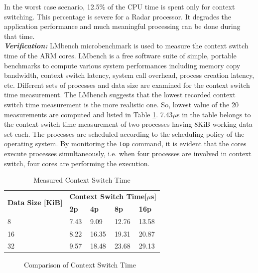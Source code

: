 In the worst case scenario, 12.5\% of the CPU time is spent only for context switching. This percentage is severe for a Radar processor. It degrades the application performance and much meaningful processing can be done during that time. \\

\textbf{\textsl{Verification:}} LMbench microbenchmark\cite{lmbench} is used to measure the context switch time of the ARM cores. LMbench is a free software suite of simple, portable benchmarks to compute various system performances including memory copy bandwidth, context switch latency, system call overhead, process creation latency, etc. Different sets of processes and data size are examined for the context switch time measurement. The LMbench suggests that the lowest recorded context switch time measurement is the more realistic one. So, lowest value of the 20 measurements are computed and listed in Table \ref{mm:ctxsw:lmbench}. 7.43$\mu$s in the table belongs to the context switch time measurement of two processes having 8KiB working data set each. The processes are scheduled according to the scheduling policy of the operating system. By monitoring the \verb|top| command, it is evident that the cores execute processes simultaneously, i.e. when four processes are involved in context switch, four cores are performing the execution.

\begin{table}[h!]
	\begin{tabularx}{\textwidth}{|X|X|X|X|X|}
		\hline
		\multirow{2}{*}{\textbf{Data Size [KiB]}} & \multicolumn{4}{c|}{\textbf{Context Switch Time[\boldmath$\mu$s]}} \\ \cline{2-5}
		& \textbf{2p} & \textbf{4p} & \textbf{8p} & \textbf{16p}  \\ \hline 
		8 & 7.43 & 9.09 & 12.76 & 13.58 \\ \hline
		16 & 8.22 & 16.35 & 19.31 & 20.87 \\ \hline
		32 & 9.57 & 18.48 & 23.68 & 29.13 \\ \hline
	\end{tabularx}
\caption{Measured Context Switch Time}
\label{mm:ctxsw:lmbench}
\end{table}

\begin{figure}[h!]
\centering
{}
\caption{Comparison of Context Switch Time}
\label{mm:cntxt_switch_graph}
\end{figure}

